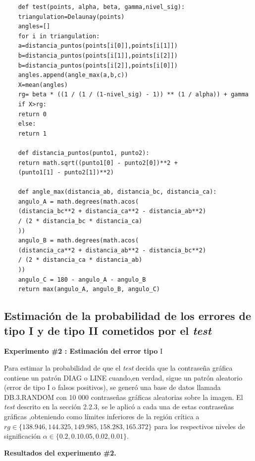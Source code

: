 \documentclass[12pt]{report}
\begin{document}
\begin{lstlisting}
	def test(points, alpha, beta, gamma,nivel_sig):
	triangulation=Delaunay(points)
	angles=[]
	for i in triangulation:
	a=distancia_puntos(points[i[0]],points[i[1]])
	b=distancia_puntos(points[i[1]],points[i[2]])
	b=distancia_puntos(points[i[2]],points[i[0]])
	angles.append(angle_max(a,b,c))     
	X=mean(angles) 
	rg= beta * ((1 / (1 / (1-nivel_sig) - 1)) ** (1 / alpha)) + gamma
	if X>rg:
	return 0
	else:
	return 1
	
	def distancia_puntos(punto1, punto2):
	return math.sqrt((punto1[0] - punto2[0])**2 +
	(punto1[1] - punto2[1])**2)
	
	def angle_max(distancia_ab, distancia_bc, distancia_ca):
	angulo_A = math.degrees(math.acos(
	(distancia_bc**2 + distancia_ca**2 - distancia_ab**2) 
	/ (2 * distancia_bc * distancia_ca)
	))
	angulo_B = math.degrees(math.acos(
	(distancia_ca**2 + distancia_ab**2 - distancia_bc**2) 
	/ (2 * distancia_ca * distancia_ab)
	))
	angulo_C = 180 - angulo_A - angulo_B  
	return max(angulo_A, angulo_B, angulo_C)
\end{lstlisting}

\subsection{Estimación de la probabilidad de los errores de tipo I y de tipo II  cometidos por el \textit{test}}	 
\textbf{Experimento \#2 : Estimación del error tipo} I

Para estimar la probabilidad de que el \textit{test} decida que la contraseña gráfica contiene un patrón DIAG o LINE cuando,en verdad, sigue un patrón aleatorio (error de tipo I o falsos positivos), se generó una base de datos llamada DB.3.RANDOM con 10 000 contraseñas gráficas aleatorias sobre la imagen. El \textit{test} descrito en la sección 2.2.3, se le aplicó a cada una de estas contraseñas gráficas ,obteniendo como límites inferiores de la región crítica a  $rg \in \{138.946, 144.325, 149.985, 158.283, 165.372\}$  para los respectivos  niveles de significación $\alpha \in \{0.2, 0.1 0.05, 0.02 , 0.01\}$.



\textbf{Resultados del experimento \#2.}
\end{document}
